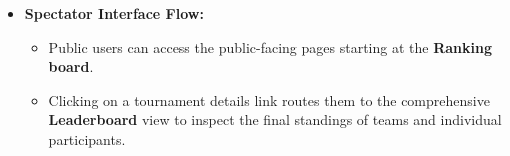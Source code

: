\begin{itemize}
	\item \textbf{Spectator Interface Flow:}
	\begin{itemize}
		\item Public users can access the public-facing pages starting at the \textbf{Ranking board}.
		\item Clicking on a tournament details link routes them to the comprehensive \textbf{Leaderboard} view to inspect the final standings of teams and individual participants.
	\end{itemize}
\end{itemize}